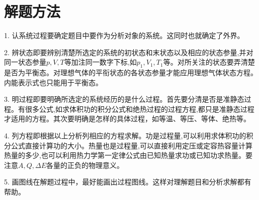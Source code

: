 \section{解题方法}
1. 认系统\quad 过程要确定题目中要作为分析对象的系统。这同时也就确定了外界。\jg
\par 2. 辨状态\quad 即要辨别清楚所选定的系统的初状态和末状态以及相应的状态参量,并对同一状态参量$p,V,T$等加注同一数字下标,如$p_1,V_1,T_1$等。对所关注的状态要弄清楚是否为平衡态。对理想气体的平衔状态的各状态参量才能应用理想气体状态方程。内能表示式也只能用于平衡态。\jg
\par 3. 明过程\quad 即要明确所选定的系统经历的是什么过程。首先要分清是否是准静态过程。有很多公式,如求体积功的积分公式和绝热过程的过程方程,都只是准静态过程才适用的方程。其次要明确是怎样的具体过程，如等温、等压、等体、绝热等。\jg
\par 4. 列方程\quad 即根据以上分析列相应的方程求解。功是过程量,可以利用求体积功的积分公式直接计算功的大小。热量也是过程量,可以直接利用定压或定容热容量计算热量的多少,也可以利用热力学第一定律公式由已知热量求功或已知功求热量。要注意$A,Q,\Delta E$各量的正负的物理意义。\jg
\par 5. 画图线\quad 在解题过程中，最好能画出过程图线。这样对理解题目和分析求解都有帮助。



